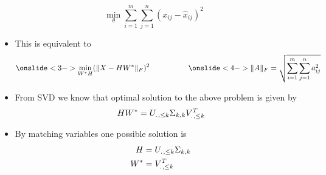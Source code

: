 \begin{frame}
    \begin{overlayarea}{\textwidth}{\textheight}
        \small{
        \begin{equation} \label{equ:1}
            \min\limits_\theta\sum\limits_{i=1}^m\sum\limits_{j=1}^n(x_{ij}-\hat{x}_{ij})^2    
        \end{equation}
        \vspace{-0.1in}

        \begin{itemize}\justifying
            \vspace{-0.2in}
            \item <2-> This is equivalent to 
            \vspace{-0.2in}
            \begin{align*}
                \onslide<3->{\min\limits_{W^*H}(\|X-HW^*\|_F)^2 \hspace{0.2in} \hspace{0.5in}} 
                \onslide<4->{\|A\|_F = \sqrt{\sum\limits_{i=1}^m\sum\limits_{j=1}^na_{ij}^2}}
            \end{align*}
        

            \item<6->From SVD we know that optimal solution to the above problem is given by 
            \begin{align*}
                HW^* = U_{.\hspace{0.01in},\leq k}\Sigma_{k,k}V_{.\hspace{0.01in},\leq k}^T
            \end{align*}
        
            \item<7-> By matching variables one possible solution is
            \begin{align*}
                H &=U_{.\hspace{0.01in},\leq k}\Sigma_{k,k} \\
                W^* &= V_{.\hspace{0.01in},\leq k}^T
            \end{align*} 
        \end{itemize}}
    \end{overlayarea}
\end{frame}


